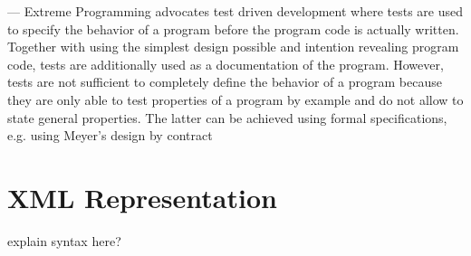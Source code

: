 ---
Extreme Programming advocates test driven development where tests are used
to specify the behavior of a program before the program code is actually written.
Together with using the simplest design possible and intention revealing program
code, tests are additionally used as a documentation of the program. However,
tests are not sufficient to completely define the behavior of a program because
they are only able to test properties of a program by example and do not allow to
state general properties. The latter can be achieved using formal specifications,
e.g. using Meyer’s design by contract %

\section{XML Representation}
explain syntax here?